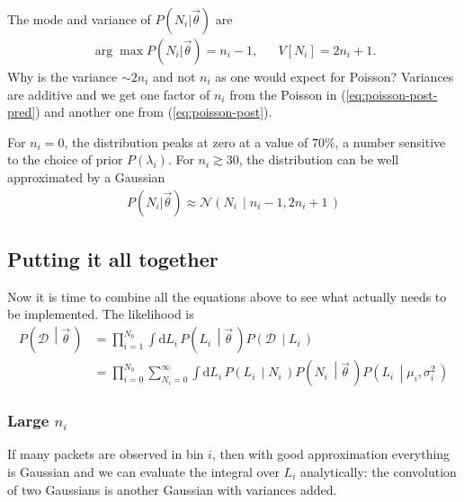 \documentclass[a4,12pt]{article}
\newcommand{\data}{\ensuremath{\mathcal{D}}}
\newcommand{\given}[2]{\left(#1\, \middle| #2 \, \right)}
\newcommand{\gaussian}{\ensuremath{\mathcal{N}}}
\newcommand{\Lumi}{\ensuremath{L_i}}
\newcommand{\rmdx}[1]{\mbox{d} #1 \,} %
\newcommand{\vecth}{\ensuremath{{\vec{\theta}}}}
\newcommand{\mui}{\mu_i}
\newcommand{\sigi}{\sigma_i^2}
\def \refeq#1{(\ref{eq:#1})}
\begin{document}
The mode and variance of $P(N_i | \vecth)$ are
\begin{align}
  \label{eq:poisson-mode-variance}
  \arg \max P(N_i | \vecth) = n_i -1, && V[N_i] = 2 n_i + 1.
\end{align}
Why is the variance $\sim 2 n_i$ and not $n_i$ as one would expect for Poisson? Variances are additive and we get one factor of $n_i$ from the Poisson in \refeq{poisson-post-pred} and another one from \refeq{poisson-post}.

For $n_i=0$, the distribution peaks at zero at a value of $70\%$, a
number sensitive to the choice of prior $P(\lambda_i)$.  For $n_i \gtrsim 30$, the
distribution can be well approximated by a Gaussian
\begin{align}
  \label{eq:poisson-gauss-approx}
  P(N_i | \vecth) \approx \gaussian \given{N_i}{n_i-1, 2 n_i + 1}
\end{align}

\subsection{Putting it all together}

Now it is time to combine all the equations above to see what actually
needs to be implemented. The likelihood is
\begin{align}
  \label{eq:all-likelihood}
  P\given{\data}{\vecth} &= \prod_{i=1}^{N_b} \int \rmdx{\Lumi} P\given{\Lumi}{\vecth}   P\given{\data}{\Lumi}\\
  &= \prod_{i=0}^{N_b} \sum_{N_i=0}^\infty \int \rmdx{\Lumi} P \given{\Lumi}{N_i}
  P\given{N_i}{\vecth} P\given{\Lumi}{\mui, \sigi}
\end{align}


\subsubsection*{Large $n_i$}

If many packets are observed in bin $i$, then with good approximation
everything is Gaussian and we can evaluate the integral over $\Lumi$
analytically: the convolution of two Gaussians is another Gaussian
with variances added.
\end{document}
